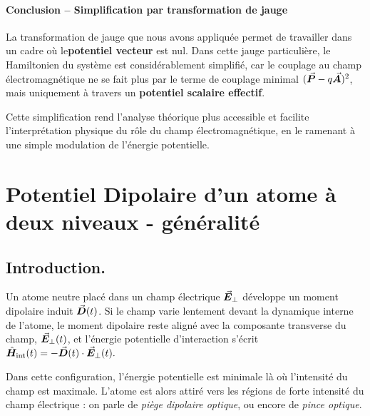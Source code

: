 \paragraph{Conclusion – Simplification par transformation de jauge}
\bigskip
La transformation de jauge que nous avons appliquée permet de travailler dans un cadre où le{\bf  potentiel vecteur} est nul. Dans cette jauge particulière, le Hamiltonien du système est considérablement simplifié, car le couplage au champ électromagnétique ne se fait plus par le terme de couplage minimal \((\vec{{\bm{P}}} - q \vec{{\bm{A}}})^2\), mais uniquement à travers un {\bf potentiel scalaire effectif}.

Cette simplification rend l’analyse théorique plus accessible et facilite l’interprétation physique du rôle du champ électromagnétique, en le ramenant à une simple modulation de l’énergie potentielle.




\section{Potentiel Dipolaire d'un atome à deux niveaux - généralité}

\subsection{Introduction.}
Un atome neutre placé dans un champ électrique $\vec{{\bm{E}}}_\perp$ développe un moment dipolaire induit $\vec{{\bm{D}}}(t)$. Si le champ varie lentement devant la dynamique interne de l’atome, le moment dipolaire reste aligné avec la composante transverse du champ, $\vec{{\bm{E}}}_\perp(t)$, et l’énergie potentielle d’interaction s’écrit 
\(
 \hat{\bm{H}}_{\text{int}}(t) = -\vec{{\bm{D}}}(t) \cdot \vec{{\bm{E}}}_\perp(t).
\)

Dans cette configuration, l’énergie potentielle est minimale là où l’intensité du champ est maximale. L’atome est alors attiré vers les régions de forte intensité du champ électrique : on parle de \textit{piège dipolaire optique}, ou encore de \textit{pince optique}.

